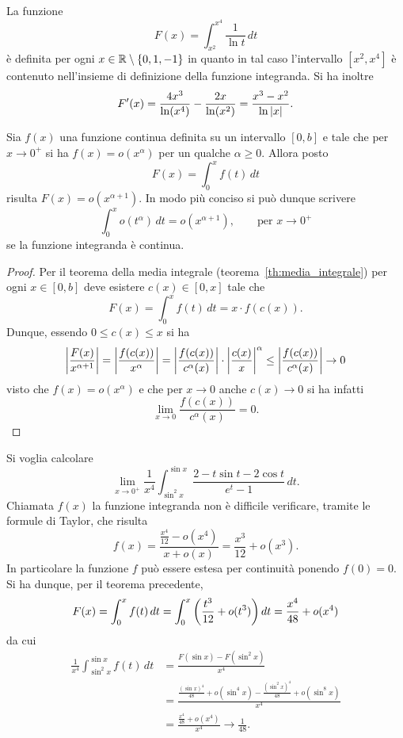 \begin{example}
La funzione
\[
 F(x) = \int_{x^2}^{x^4} \frac{1}{\ln t}\, dt
\]
è definita per ogni $x\in {\mathbb R}\setminus{\left\{ 0,1,-1 \right\}}$ 
in quanto in tal caso l'intervallo
$[x^2,x^4]$ è contenuto nell'insieme di definizione
della funzione integranda.
Si ha inoltre
\[
F'(x)
= \frac{4x^3}{\ln (x^4)} - \frac{2x}{\ln (x^2)}
= \frac{x^3-x^2}{\ln {\left|x\right|}}.
\]
\end{example}

\begin{theorem}
Sia $f(x)$ una funzione continua definita
su un intervallo $[0,b]$ e tale che
per $x\to 0^+$ si ha
$f(x) = o(x^\alpha)$ per un qualche $\alpha\ge 0$.
Allora posto
\[
  F(x) = \int_0^x f(t)\, dt
\]
risulta $F(x) = o(x^{\alpha+1})$.
In modo più conciso si può dunque scrivere
\[
  \int_0^x o(t^\alpha)\, dt = o (x^{\alpha+1}),
  \qquad \text{per $x\to 0^+$}
\]
se la funzione integranda è continua.
\end{theorem}
%
\begin{proof}
Per il teorema della media integrale (teorema~\ref{th:media_integrale})
per ogni $x\in [0,b]$ deve esistere $c(x)\in[0,x]$ tale che
\[
  F(x)
  = \int_0^x f(t)\, dt
  = x \cdot f(c(x)).
\]
Dunque, essendo $0\le c(x)\le x$ si ha
\[
{\left|\frac{F(x)}{x^{\alpha+1}}\right|}
= {\left|\frac{f(c(x))}{x^\alpha}\right|}
= {\left|\frac{f(c(x))}{c^\alpha(x)}\right|}
\cdot {\left|\frac{c(x)}{x}\right|}^\alpha
\le {\left|\frac{f(c(x))}{c^\alpha(x)}\right|} \to 0
\]
visto che $f(x) = o(x^\alpha)$
e che per $x\to 0$ anche $c(x)\to 0$
si ha infatti
\[
  \lim_{x\to 0} \frac{f(c(x))}{c^\alpha(x)} = 0.
\]
\end{proof}

\begin{example}
Si voglia calcolare
\[
  \lim_{x\to 0^+} \frac{1}{x^4}\int_{\sin^2 x}^{\sin x} \frac{2- t\sin t - 2 \cos t}{e^t - 1}\, dt.
\]
Chiamata $f(x)$ la funzione integranda non è difficile
verificare, tramite le formule di Taylor, che risulta
\[
  f(x)
  = \frac{\frac{x^4}{12}-o(x^4)}{x+o(x)}
  = \frac{x^3}{12} + o(x^3).
\]
In particolare la funzione $f$ può essere estesa per
continuità ponendo $f(0)=0$.
Si ha dunque, per il teorema precedente,
\[
  F(x) = \int_0^x f(t)\, dt
  = \int_0^x {\left( \frac{t^3}{12}+o(t^3) \right)}\, dt
  = \frac{x^4}{48} + o(x^4)
\]
da cui
\begin{align*}
 \frac{1}{x^4} \int_{\sin^2 x}^{\sin x}
 f(t) \, dt
 &= \frac{F(\sin x) - F(\sin^2 x)}{x^4}\\
 &= \frac{\frac{(\sin x)^4}{48} + o(\sin^4 x) - \frac{(\sin^2 x)^4}{48} + o(\sin^8 x)}{x^4} \\
 &= \frac{\frac{x^4}{48} + o(x^4)}{x^4} \to \frac{1}{48}.
\end{align*}
\end{example}

